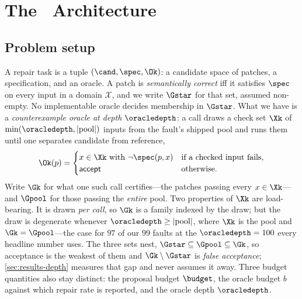 \section{The \CEGMem\ Architecture}
\label{sec:arch}

\subsection{Problem setup}
A repair task is a tuple $(\cand, \spec, \Ok)$: a candidate space of patches, a
specification, and an oracle. A patch is \emph{semantically correct} iff it
satisfies $\spec$ on every input in a domain $\mathcal{X}$, and we write
$\Gstar$ for that set, assumed non-empty. No implementable oracle decides
membership in $\Gstar$. What we have is a \emph{counterexample oracle at depth
$\oracledepth$}: a call draws a check set $\Xk$ of
$\min(\oracledepth, \lvert\mathrm{pool}\rvert)$ inputs from the fault's shipped
pool and runs them until one separates candidate from reference,
\begin{equation}
\Ok(p) =
\begin{cases}
x \in \Xk \text{ with } \lnot\spec(p, x) & \text{if a checked input fails},\\
\textsf{accept} & \text{otherwise}.
\end{cases}
\label{eq:oracle}
\end{equation}
Write $\Gk$ for what one such call certifies---the patches passing every
$x \in \Xk$---and $\Gpool$ for those passing the \emph{entire} pool. Two
properties of $\Xk$ are load-bearing. It is drawn \emph{per call}, so $\Gk$ is
a family indexed by the draw; but the draw is degenerate whenever
$\oracledepth \ge \lvert\mathrm{pool}\rvert$, where $\Xk$ is the pool and
$\Gk = \Gpool$---the case for $97$ of our $99$ faults at the
$\oracledepth = 100$ every headline number uses. The three
sets nest, $\Gstar \subseteq \Gpool \subseteq \Gk$, so acceptance is the
weakest of them and $\Gk \setminus \Gstar$ is \emph{false acceptance};
\cref{sec:results-depth} measures that gap and never assumes it away. Three budget quantities also stay distinct: the proposal budget
$\budget$, the oracle budget $b$ against which repair rate is reported, and the
oracle depth $\oracledepth$.

\ifsuppmatter\else\fi

